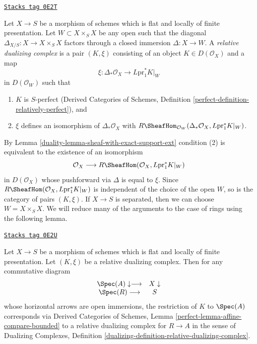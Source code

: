 \begin{definition}
\label{duality-definition-relative-dualizing-complex}
\href{https://stacks.math.columbia.edu/tag/0E2T}{\texttt{Stacks tag 0E2T}}

Let $X \to S$ be a morphism of schemes which is flat and
locally of finite presentation. Let $W \subset X \times_S X$
be any open such that the diagonal $\Delta_{X/S} : X \to X \times_S X$
factors through a closed immersion $\Delta : X \to W$.
A {\it relative dualizing complex} is a
pair $(K, \xi)$ consisting of an object $K \in D(\mathcal{O}_X)$
and a map
$$
\xi : \Delta_*\mathcal{O}_X \longrightarrow L\text{pr}_1^*K|_W
$$
in $D(\mathcal{O}_W)$ such that
\begin{enumerate}
\item $K$ is $S$-perfect (Derived Categories of Schemes, Definition
\ref{perfect-definition-relatively-perfect}), and
\item $\xi$ defines an isomorphism of $\Delta_*\mathcal{O}_X$
with
$R\SheafHom_{\mathcal{O}_W}(
\Delta_*\mathcal{O}_X, L\text{pr}_1^*K|_W)$.
\end{enumerate}
\end{definition}

By Lemma \ref{duality-lemma-sheaf-with-exact-support-ext} condition (2)
is equivalent to the existence of an isomorphism
$$
\mathcal{O}_X \longrightarrow
R\SheafHom(\mathcal{O}_X, L\text{pr}_1^*K|_W)
$$
in $D(\mathcal{O}_X)$ whose pushforward via $\Delta$ is equal to $\xi$.
Since $R\SheafHom(\mathcal{O}_X, L\text{pr}_1^*K|_W)$ is independent
of the choice of the open $W$, so is the category of pairs $(K, \xi)$.
If $X \to S$ is separated, then we can choose $W = X \times_S X$.
We will reduce many of the arguments to the case of rings
using the following lemma.

\begin{lemma}
\label{duality-lemma-relative-dualizing-complex-algebra}
\href{https://stacks.math.columbia.edu/tag/0E2U}{\texttt{Stacks tag 0E2U}}

Let $X \to S$ be a morphism of schemes which is flat and
locally of finite presentation. Let $(K, \xi)$ be a relative
dualizing complex. Then for any commutative diagram
$$
\begin{array}{cc}\Spec(A) \downarrow\longrightarrow & X \downarrow \\ \Spec(R) \longrightarrow & S\end{array}
$$
whose horizontal arrows are open immersions, the
restriction of $K$ to $\Spec(A)$ corresponds via
Derived Categories of Schemes, Lemma
\ref{perfect-lemma-affine-compare-bounded}
to a relative dualizing complex for $R \to A$
in the sense of Dualizing Complexes, Definition
\ref{dualizing-definition-relative-dualizing-complex}.
\end{lemma}

